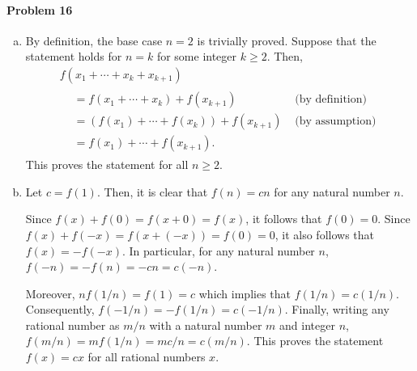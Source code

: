 \documentclass{article}
\begin{document}
\paragraph{Problem 16}
\begin{enumerate}[(a)]
  \item By definition, the base case $n = 2$ is trivially proved. Suppose that
    the statement holds for $n = k$ for some integer $k \geq 2$. Then,
    \begin{multline*}
      f(x_1 + \cdots + x_k + x_{k+1}) \\
      \begin{aligned}
        &= f(x_1 + \cdots + x_k) + f(x_{k+1}) &\text{ (by definition)} \\
        &= (f(x_1) + \cdots + f(x_k)) + f(x_{k+1}) &\text{ (by assumption)} \\
        &= f(x_1) + \cdots + f(x_{k+1}).
      \end{aligned}
    \end{multline*}
    This proves the statement for all $n \geq 2$.
  \item Let $c = f(1)$. Then, it is clear that $f(n) = cn$ for any natural
    number $n$.

    Since $f(x) + f(0) = f(x + 0) = f(x)$, it follows that $f(0) = 0$. Since
    $f(x) + f(-x) = f(x + (-x)) = f(0) = 0$, it also follows that $f(x) =
    -f(-x)$. In particular, for any natural number $n$, $f(-n) = -f(n) = -cn =
    c(-n)$.

    Moreover, $nf(1/n) = f(1) = c$ which implies that $f(1/n) = c(1/n)$.
    Consequently, $f(-1/n) = -f(1/n) = c(-1/n)$. Finally, writing any rational
    number as $m/n$ with a natural number $m$ and integer $n$, $f(m/n) =
    mf(1/n) = mc/n = c(m/n)$. This proves the statement $f(x) = cx$ for all
    rational numbers $x$.
\end{enumerate}
\end{document}
